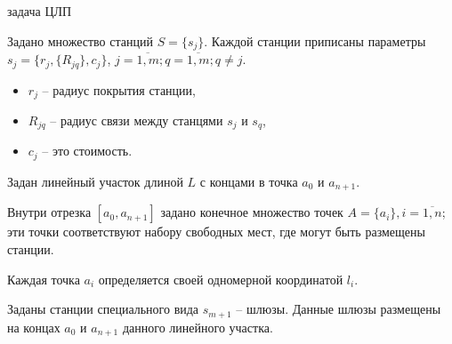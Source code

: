
\begin{frame}
    {задача ЦЛП}
    \justifying

    \bigskip

    Задано множество станций $S = \{s_j\}$. Каждой станции приписаны параметры $s_j = \{r_j, \{R_{jq}\}, c_j \}$, $j = \overline{1,m}; q = \overline{1,m}; q \neq j$. 
    \begin{itemize}
        \item $r_j$ -- радиус покрытия станции,
        \item $R_{jq}$ -- радиус связи между станцями $s_j$ и $s_q$,
        \item $c_j$ -- это стоимость.
    \end{itemize} 
    
    \bigskip

    Задан линейный участок длиной $L$ с концами в точка $a_0$ и $a_{n+1}$. 
    
    Внутри  отрезка $[a_0, a_{n+1}]$ задано конечное множество точек $A=\{a_i\}, i=\overline{1,n}$; эти точки соответствуют набору свободных мест, где могут быть размещены станции.
    
    Каждая точка $a_i$ определяется своей одномерной координатой $l_i$. 
    
    \bigskip
    
    Заданы станции специального вида $s_{m+1}$ -- шлюзы. Данные шлюзы размещены на концах $a_0$ и $a_{n+1}$ данного линейного участка. 
    \bigskip

\end{frame}

